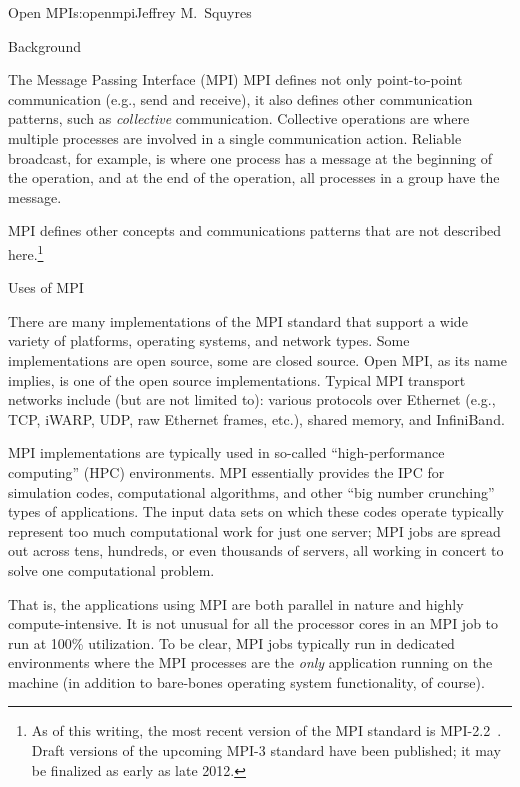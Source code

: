\begin{aosachapter}{Open MPI}{s:openmpi}{Jeffrey M.\ Squyres}
\begin{aosasect1}{Background}
\begin{aosasect2}{The Message Passing Interface (MPI)}
MPI defines not only point-to-point communication (e.g., send and
receive), it also defines other communication patterns, such as
\emph{collective} communication.  Collective operations are where
multiple processes are involved in a single communication action.
Reliable broadcast, for example, is where one process has a message at
the beginning of the operation, and at the end of the operation, all
processes in a group have the message.

MPI defines other concepts and communications patterns that are not
described here.\footnote{As of this writing, the most recent version
  of the MPI standard is MPI-2.2~\cite{bib:mpi-22}.  Draft versions of
  the upcoming MPI-3 standard have been published; it may be finalized
  as early as late 2012.}

\end{aosasect2}


\begin{aosasect2}{Uses of MPI}

There are many implementations of the MPI standard that support a
wide variety of platforms, operating systems, and network types.
Some implementations are open source, some are closed source.  
%
Open MPI, as its name implies, is one of the open source
implementations.
%
Typical MPI transport networks include (but are not limited to):
various protocols over Ethernet (e.g., TCP, iWARP, UDP, raw Ethernet
frames, etc.), shared memory, and InfiniBand.

MPI implementations are typically used in so-called ``high-performance
computing'' (HPC) environments.  MPI essentially provides the IPC for
simulation codes, computational algorithms, and other ``big number
crunching'' types of applications.  The input data sets on which these
codes operate typically represent too much computational work for just
one server; MPI jobs are spread out across tens, hundreds, or even
thousands of servers, all working in concert to solve one
computational problem.

That is, the applications using MPI are both parallel in nature and
highly compute-intensive.  It is not unusual for all the processor
cores in an MPI job to run at 100\% utilization.  To be clear, MPI
jobs typically run in dedicated environments where the MPI processes
are the \emph{only} application running on the machine (in addition to
bare-bones operating system functionality, of course).


\end{aosasect2}
\end{aosasect1}
\end{aosachapter}
